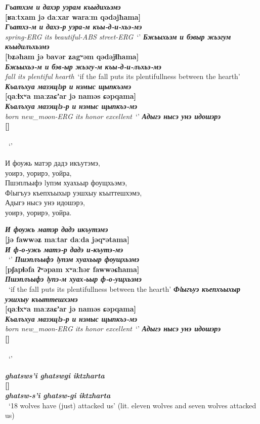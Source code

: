 \documentclass[a4paper,12pt]{book}
\newcommand{\1}[1]{\textbf{\emph{#1}}} %
\newcommand{\2}[1]{\textbf{[#1]}} %
\newcommand{\3}[1]{\fontsize{11pt}{0cm}\textbf{\emph{#1}}} %
\newcommand{\4}[1]{\fontsize{10pt}{0cm}\emph{#1}}	%
\newcommand{\5}[1]{\textbf{/#1/}} %
\newcommand{\6}[1]{\textbf{[#1]}} %
\newcommand{\7}[1]{\fontsize{12pt}{0cm}\emph{#1}} %
\newcommand{\8}[1]{\fontsize{12pt}{0cm}`#1'} %
\newcommand{\9}[1]{\fontsize{12pt}{0cm}(lit. `#1')} %
\begin{document}
\begin{exe}
\ex
\1{Гъатхэм и дахэр уэрам къыдихьэмэ}\\
\2{ʁaːtxam jə daːxar waraːm qədəjħama}\\
\3{Гъатхэ-м и дахэ-р уэра-м къы-д-и-хьэ-мэ}\\
\4{spring-ERG its beautiful-ABS street-ERG}\
\trans \8{}
\ex
\1{Бжьыхьэм и бэвыр жьэгум къыдилъхьэмэ}\\
\2{bʑəħam jə bavər ʑagʷəm qədəjɬħama}\\
\3{Бжьыхьэ-м и бэв-ыр жьэгу-м къы-д-и-лъхьэ-мэ}\\
\4{fall its plentiful hearth}\
\trans \8{if the fall puts its plentifullness between the hearth}
\ex
\1{Къалъхуа мазэщlэр и нэмыс щыпкъэмэ}\\
\2{qaːɬxʷa maːzaɕʼar jə naməs ɕəpqama}\\
\3{Къалъхуа мазэщlэ-р и нэмыс щыпкъэ-мэ}\\
\4{born new_moon-ERG its honor excellent}\
\trans \8{}
\ex
\1{Адыгэ нысэ унэ идошэрэ}\\
\2{}\\
\3{}\\
\4{}\
\trans \8{}

\end{exe}




И фоужь матэр дадэ икъутэмэ,\\
уоирэ, уорирэ, уойра,\\
Пшэплъыфэ lупэм хуахьыр фоущхьэмэ,\\
Фlыгъуэ къепхъыхыр уэшхыу къыттешхэмэ,\\
Адыгэ нысэ унэ идошэрэ,\\
уоирэ, уорирэ, уойра.\\

\begin{exe}
\ex
\1{И фоужь матэр дадэ икъутэмэ}\\
\2{jə fawwəʑ maːtar daːda jəqʷətama}\\
\3{И ф-о-ужь матэ-р дадэ и-къутэ-мэ}\\
\4{}\
\trans \8{}
\ex
\1{Пшэплъыфэ lупэм хуахьыр фоущхьэмэ}\\
\2{pʃapɬəfa ʔʷəpam xʷaːħər fawwəɕħama}\\
\3{Пшэплъыфэ lупэ-м хуах-ьыр ф-о-ущхьэмэ}\\
\4{}\
\trans \8{if the fall puts its plentifullness between the hearth}
\ex
\1{Фlыгъуэ къепхъыхыр уэшхыу къыттешхэмэ}\\
\2{qaːɬxʷa maːzaɕʼar jə naməs ɕəpqama}\\
\3{Къалъхуа мазэщlэ-р и нэмыс щыпкъэ-мэ}\\
\4{born new_moon-ERG its honor excellent}\
\trans \8{}
\ex
\1{Адыгэ нысэ унэ идошэрэ}\\
\2{}\\
\3{}\\
\4{}\
\trans \8{}

\end{exe}




\begin{exe}
\ex
\1{ghatsws'i ghatswgi iktzharta}\\
\2{}\\
\3{ghatsw-s'i ghatsw-gi iktzharta}\\
\4{}\
\trans \8{18 wolves have (just) attacked us} (lit. eleven wolves and seven wolves attacked us)
\end{exe}
\end{document}
